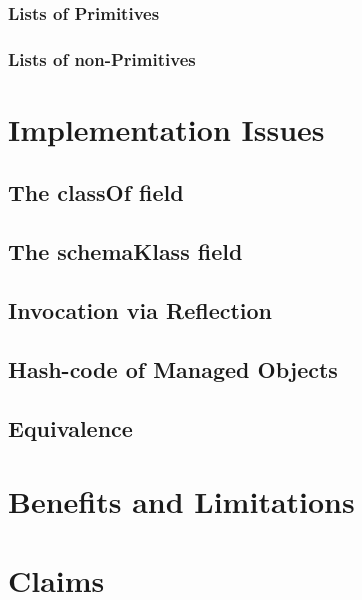\subsubsection{Lists of Primitives}
\subsubsection{Lists of non-Primitives}

\section{Implementation Issues}\label{Implementation Issues}
\subsection{The classOf field}\label{The classOf field}
\subsection{The schemaKlass field}\label{The schemaKlass field}
\subsection{Invocation via Reflection}\label{Invocation via Reflection}
\subsection{Hash-code of Managed Objects}\label{Hashcode of Managed Objects}
\subsection{Equivalence}\label{Managed Object equivalence}

\section{Benefits and Limitations}\label{Benefits and Limitations}

\section{Claims}\label{Implementation Claims}